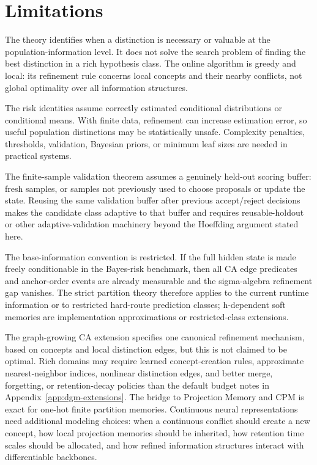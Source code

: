 \section{Limitations}
\label{app:limitations}

The theory identifies when a distinction is necessary or valuable at the population-information level. It does not solve the search problem of finding the best distinction in a rich hypothesis class. The online algorithm is greedy and local: its refinement rule concerns local concepts and their nearby conflicts, not global optimality over all information structures.

The risk identities assume correctly estimated conditional distributions or conditional means. With finite data, refinement can increase estimation error, so useful population distinctions may be statistically unsafe. Complexity penalties, thresholds, validation, Bayesian priors, or minimum leaf sizes are needed in practical systems.

The finite-sample validation theorem assumes a genuinely held-out scoring buffer: fresh samples, or samples not previously used to choose proposals or update the state. Reusing the same validation buffer after previous accept/reject decisions makes the candidate class adaptive to that buffer and requires reusable-holdout or other adaptive-validation machinery beyond the Hoeffding argument stated here.

The base-information convention is restricted. If the full hidden state is made freely conditionable in the Bayes-risk benchmark, then all CA edge predicates and anchor-order events are already measurable and the sigma-algebra refinement gap vanishes. The strict partition theory therefore applies to the current runtime information or to restricted hard-route prediction classes; h-dependent soft memories are implementation approximations or restricted-class extensions.

The graph-growing CA extension specifies one canonical refinement mechanism, based on concepts and local distinction edges, but this is not claimed to be optimal. Rich domains may require learned concept-creation rules, approximate nearest-neighbor indices, nonlinear distinction edges, and better merge, forgetting, or retention-decay policies than the default budget notes in Appendix~\ref{app:dgm-extensions}. The bridge to Projection Memory and CPM is exact for one-hot finite partition memories. Continuous neural representations need additional modeling choices: when a continuous conflict should create a new concept, how local projection memories should be inherited, how retention time scales should be allocated, and how refined information structures interact with differentiable backbones.

